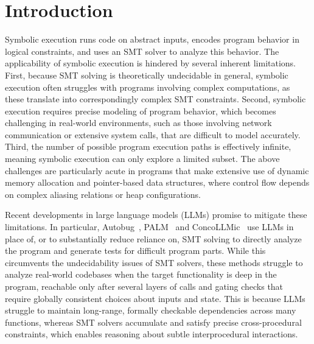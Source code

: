\documentclass[acmsmall]{acmart}
\theoremstyle{definition}
\begin{document}


\maketitle


\section{Introduction}

Symbolic execution runs code on abstract inputs, encodes program behavior in logical constraints, and uses an SMT solver to analyze this behavior. The applicability of symbolic execution is hindered by several inherent limitations. First, because SMT solving is theoretically undecidable in general, symbolic execution often struggles with programs involving complex computations, as these translate into correspondingly complex SMT constraints. Second, symbolic execution requires precise modeling of program behavior, which becomes challenging in real-world environments, such as those involving network communication or extensive system calls, that are difficult to model accurately. Third, the number of possible program execution paths is effectively infinite, meaning symbolic execution can only explore a limited subset. The above challenges are particularly acute in programs that make extensive use of dynamic memory allocation and pointer-based data structures, where control flow depends on complex aliasing relations or heap configurations.

Recent developments in large language models (LLMs) promise to mitigate these limitations. In particular, Autobug~\cite{autobug}, PALM~\cite{palm} and ConcoLLMic~\cite{concollmic} use LLMs in place of, or to substantially reduce reliance on, SMT solving to directly analyze the program and generate tests for difficult program parts. While this circumvents the undecidability issues of SMT solvers, these methods struggle to analyze real-world codebases when the target functionality is deep in the program,  reachable only after several layers of calls and gating checks that require globally consistent choices about inputs and state. This is because LLMs struggle to maintain long-range, formally checkable dependencies across many functions, whereas SMT solvers accumulate and satisfy precise cross-procedural constraints, which enables reasoning about subtle interprocedural interactions.
\end{document}
